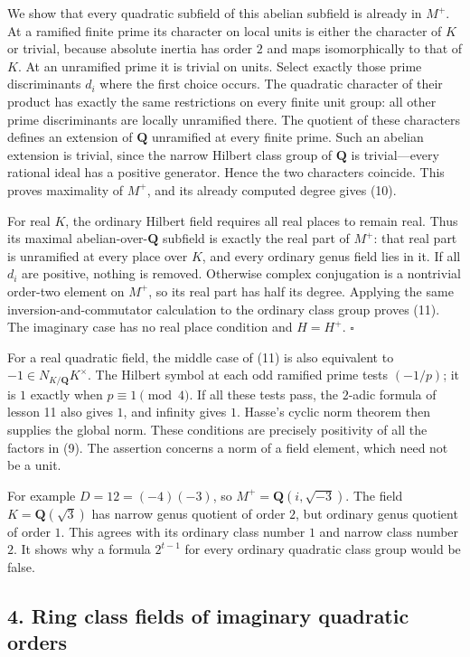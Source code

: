 \documentclass[11pt,a4paper]{article}
\begin{document}
We show that every quadratic subfield of this abelian subfield is
already in \(M^+\). At a ramified finite prime its character on local
units is either the character of \(K\) or trivial, because absolute
inertia has order \(2\) and maps isomorphically to that of \(K\). At an
unramified prime it is trivial on units. Select exactly those prime
discriminants \(d_i\) where the first choice occurs. The quadratic
character of their product has exactly the same restrictions on every
finite unit group: all other prime discriminants are locally unramified
there. The quotient of these characters defines an extension of
\(\mathbf Q\) unramified at every finite prime. Such an abelian
extension is trivial, since the narrow Hilbert class group of
\(\mathbf Q\) is trivial---every rational ideal has a positive
generator. Hence the two characters coincide. This proves maximality of
\(M^+\), and its already computed degree gives (10).

For real \(K\), the ordinary Hilbert field requires all real places to
remain real. Thus its maximal abelian-over-\(\mathbf Q\) subfield is
exactly the real part of \(M^+\): that real part is unramified at every
place over \(K\), and every ordinary genus field lies in it. If all
\(d_i\) are positive, nothing is removed. Otherwise complex conjugation
is a nontrivial order-two element on \(M^+\), so its real part has half
its degree. Applying the same inversion-and-commutator calculation to
the ordinary class group proves (11). The imaginary case has no real
place condition and \(H=H^+\). \(\square\)

For a real quadratic field, the middle case of (11) is also equivalent
to \(-1\in N_{K/\mathbf Q}K^\times\). The Hilbert symbol at each odd
ramified prime tests \((-1/p)\); it is \(1\) exactly when
\(p\equiv1\pmod4\). If all these tests pass, the \(2\)-adic formula of
lesson 11 also gives \(1\), and infinity gives \(1\). Hasse's cyclic
norm theorem then supplies the global norm. These conditions are
precisely positivity of all the factors in (9). The assertion concerns a
norm of a field element, which need not be a unit.

For example \(D=12=(-4)(-3)\), so \(M^+=\mathbf Q(i,\sqrt{-3})\). The
field \(K=\mathbf Q(\sqrt3)\) has narrow genus quotient of order \(2\),
but ordinary genus quotient of order \(1\). This agrees with its
ordinary class number \(1\) and narrow class number \(2\). It shows why
a formula \(2^{t-1}\) for every ordinary quadratic class group would be
false.

\subsection{4. Ring class fields of imaginary quadratic
orders}\label{ring-class-fields-of-imaginary-quadratic-orders}
\end{document}
